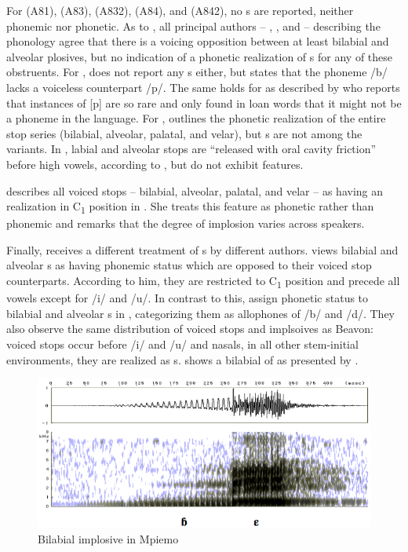 \documentclass[output=paper,modfonts,nonflat,
\ChapterDOI{10.5281/zenodo.3367134}
 hidelinks
]{langsci/langscibook}
\begin{document}
For  (A81),  (A83),  (A832),  (A84), and  (A842), no s are reported, neither phonemic nor phonetic.   As to , all principal authors -- \citet{Lemb1974}, \citet{Dieu1976}, and \citet{Yemmene2004} -- describing the phonology agree that there is a voicing opposition between at least bilabial and alveolar plosives, but no indication of a phonetic realization of s for any of these obstruents.  For , \citet{Heath2003} does not report any s either, but states that the phoneme /b/ lacks a voiceless counterpart /p/. The same holds for  as described by \citet{Henson2007} who reports that instances of [p] are so rare and only found in loan words that it might not be a phoneme in the language. For , \citet{Beavon2006} outlines the phonetic realization of the entire stop series (bilabial, alveolar, palatal, and velar), but s are not among the variants. In , labial and alveolar stops are ``released with oral cavity friction'' before high vowels, according to \citet[134]{Beavon1983}, but do not exhibit  features.


\citet[147]{Cheucle2014} describes all voiced stops -- bilabial, alveolar, palatal, and velar -- as having an  realization in C\textsubscript{1} position in . She treats this feature as phonetic rather than phonemic and remarks that the degree of implosion varies across speakers.

Finally,  receives a different treatment of s by different authors.  \citet{Beavon1978} views bilabial and alveolar s as having phonemic status which are opposed to their voiced stop counterparts. According to him, they are restricted to C\textsubscript{1} position and precede all vowels except for /i/ and /u/. In contrast to this, \citet{Thornell2004} assign phonetic status to bilabial and alveolar s in , categorizing them as allophones of /b/ and /d/. They also observe the same distribution of voiced stops and implsoives as Beavon: voiced stops occur before /i/ and /u/ and nasals, in all other stem-initial environments, they are realized as s.  shows a bilabial  of  as presented by \citet[172]{Thornell2004}.

\begin{figure}
\caption{Bilabial {implosive} in Mpiemo} 
\label{fig:grimm:1}
\includegraphics[width=\textwidth]{figures/mpiemoB.jpg}
\end{figure}
\end{document}
